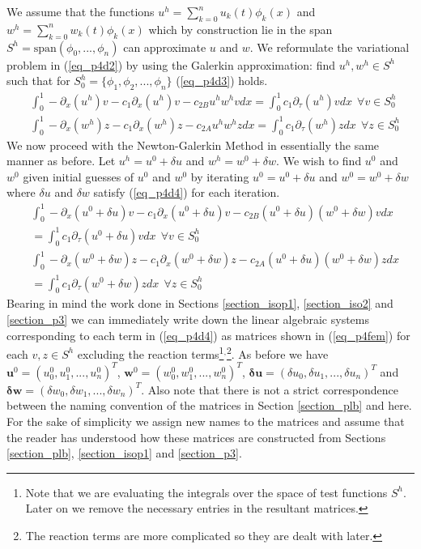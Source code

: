 \documentclass[11pt,fleqn]{article}
\theoremstyle{defstyle}
\begin{document}
We assume that the functions $u^h =\sum^n_{k=0} u_k(t) \phi_k(x)$ and $w^h =\sum^n_{k=0} w_k(t) \phi_k(x)$ which by construction lie in the span $S^h=\text{span}(\phi_0,...,\phi_n)$ can approximate $u$ and $w$. We reformulate the variational problem in (\ref{eq_p4d2}) by using the Galerkin approximation: find $u^h, w^h \in S^h$ such that for $S^h_0=\{\phi_1, \phi_2,...,\phi_n \}$ (\ref{eq_p4d3}) holds.
\begin{equation}
\begin{aligned}
&\int_0^1 -\partial_{x}(u^h)v - c_1\partial_x(u^h)v - c_{2B}u^hw^hvdx = \int_0^1 c_1\partial_\tau(u^h)v dx~~\forall v \in S^h_0 \\
&\int_0^1-\partial_{x}(w^h)z - c_1\partial_x(w^h)z - c_{2A}u^hw^hzdx = \int_0^1 c_1\partial_\tau(w^h)zdx~~\forall z \in S^h_0 
\end{aligned}
\label{eq_p4d3}
\end{equation}
We now proceed with the Newton-Galerkin Method in essentially the same manner as before. Let $u^h = u^0 + \delta u$ and $w^h=w^0 +\delta w$. We wish to find $u^0$ and $w^0$ given initial guesses of $u^0$ and $w^0$ by iterating $u^0 = u^0 + \delta u$ and $w^0=w^0+\delta w$ where $\delta u$ and $\delta w$ satisfy (\ref{eq_p4d4}) for each iteration.
\begin{equation}
\begin{aligned}
&\int_0^1 -\partial_{x}(u^0 + \delta u)v - c_1\partial_x(u^0 + \delta u)v - c_{2B}(u^0 + \delta u)(w^0 +\delta w)vdx \\ &= \int_0^1 c_1\partial_\tau(u^0 + \delta u)v dx ~~\forall v \in S^h_0 \\
&\int_0^1-\partial_{x}(w^0 +\delta w)z - c_1\partial_x(w^0 +\delta w)z - c_{2A}(u^0 + \delta u)(w^0 +\delta w)zdx  \\ &= \int_0^1 c_1\partial_\tau(w^0 +\delta w)zdx  ~~\forall z \in S^h_0
\end{aligned}
\label{eq_p4d4}
\end{equation}
Bearing in mind the work done in Sections \ref{section_isop1}, \ref{section_iso2} and \ref{section_p3} we can immediately write down the linear algebraic systems corresponding to each term in (\ref{eq_p4d4}) as matrices shown in (\ref{eq_p4fem}) for each $v,z \in S^h$ excluding the reaction terms\footnote{Note that we are evaluating the integrals over the space of test functions $S^h$. Later on we remove the necessary entries in the resultant matrices.}$^{,}$\footnote{The reaction terms are more complicated so they are dealt with later.}. As before we have $\mathbf{u}^0=\left(u^0_0,u^0_1,...,u^0_n\right)^T$, $\mathbf{w}^0=\left(w^0_0,w^0_1,...,w^0_n\right)^T$, $\mathbf{\delta u}=\left(\delta u_0,\delta u_1,...,\delta u_n\right)^T$ and $\mathbf{\delta w}=\left(\delta w_0,\delta w_1,...,\delta w_n\right)^T$. Also note that there is not a strict correspondence between the naming convention of the matrices in Section \ref{section_plb} and here. For the sake of simplicity we assign new names to the matrices and assume that the reader has understood how these matrices are constructed from Sections \ref{section_plb}, \ref{section_isop1} and \ref{section_p3}.
\end{document}
